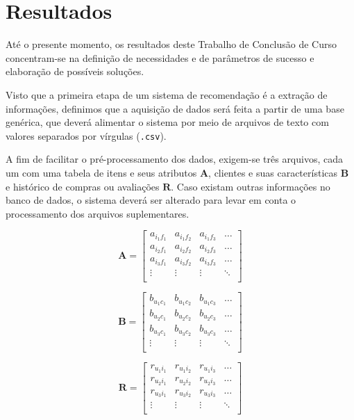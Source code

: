 \chapter[Resultados]{Resultados}
\label{chap:resultados}

Até o presente momento, os resultados deste Trabalho de Conclusão de Curso concentram-se na definição de necessidades e de parâmetros de sucesso e elaboração de possíveis soluções. 

Visto que a primeira etapa de um sistema de recomendação é a extração de informações, definimos que a aquisição de dados será feita a partir de uma base genérica, que deverá alimentar o sistema por meio de arquivos de texto com valores separados por vírgulas (\texttt{.csv}). 

A fim de facilitar o pré-processamento dos dados, exigem-se três arquivos, cada um com uma tabela de itens e seus atributos $\mathbf{A}$, clientes e suas características $\mathbf{B}$ e histórico de compras ou avaliações $\mathbf{R}$. Caso existam outras informações no banco de dados, o sistema deverá ser alterado para levar em conta o processamento dos arquivos suplementares.

\begin{equation} 
\mathbf{A} = 
\begin{bmatrix} 
 a_{i_1 f_1} &  a_{i_1 f_2} &  a_{i_1 f_3}  & \dots   \\
 a_{i_2 f_1} &  a_{i_2 f_2} &  a_{i_2 f_3}  & \dots   \\
 a_{i_3 f_1} &  a_{i_3 f_2} &  a_{i_3 f_3}  & \dots  \\ 
 \vdots &  \vdots &  \vdots  & \ddots   \\
 \end{bmatrix}
\end{equation}

\begin{equation}
	\mathbf{B} = 
\begin{bmatrix} 
 b_{u_1 c_1} &  b_{u_1 c_2} &  b_{u_1 c_3}  & \dots   \\
 b_{u_2 c_1} &  b_{u_2 c_2} &  b_{u_2 c_3}  & \dots   \\
 b_{u_3 c_1} &  b_{u_3 c_2} &  b_{u_3 c_3}  & \dots  \\ 
 \vdots &  \vdots &  \vdots  & \ddots   \\
 \end{bmatrix}
\end{equation}

\begin{equation}
	  \mathbf{R} = 
\begin{bmatrix} 
  r_{u_1 i_1} &  r_{u_1 i_2} &  r_{u_1 i_3}  & \dots   \\
 r_{u_2 i_1} &  r_{u_2 i_2} &  r_{u_2 i_3}  & \dots   \\
 r_{u_3 i_1} &  r_{u_3 i_2} &  r_{u_3 i_3}  & \dots  \\ 
 \vdots &  \vdots &  \vdots  & \ddots   \\
\end{bmatrix}
\end{equation}

